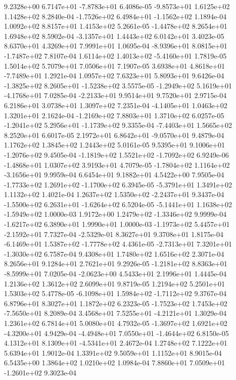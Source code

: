  9.2328e+00  6.7147e+01 -7.8783e+01  6.4086e-05
-9.8573e+01  1.6125e+02  1.1428e+02  8.2840e-04
-1.7526e+02  6.4984e+01 -1.1562e+02  1.1894e-04
1.0092e+02 8.8157e+01 1.4153e+02  5.2661e-05
-1.4478e+02  8.2654e+01  1.6948e+02  8.5902e-04
-3.1357e+01  1.4443e+02  6.0142e+01  3.4023e-05
8.6370e+01 4.3269e+01 7.9991e+01  1.0695e-04
-8.9396e+01  8.0815e+01 -1.7487e+02  7.8107e-04
 1.6114e+02  1.4013e+02 -5.4160e+01  1.7819e-05
1.5014e+02 5.7079e+01 7.0506e+01  7.1907e-05
 3.6938e+01  4.8618e+01 -7.7489e+01  1.2921e-04
1.0957e+02 7.6323e+01 5.8093e+01  9.6426e-04
-1.3825e+02  8.2605e+01 -1.5238e+02  3.5575e-05
-1.2949e+02  5.1619e+01 -4.1768e+01  7.0285e-04
-2.2133e+01  9.9514e+01  9.7520e+01  2.9715e-04
6.2186e+01 3.0738e+01 1.3097e+02  7.2351e-04
-4.1405e+01  1.0463e+02  1.3201e+01  2.1624e-04
-1.2169e+02  7.8803e+01  1.3710e+02  6.0257e-05
-1.2041e+02  5.2956e+01 -1.1739e+02  9.3355e-04
-7.4403e+01  1.5665e+02  8.2520e+01  6.6017e-05
 2.1972e+01  6.8642e+01 -9.0570e+01  9.4879e-04
1.1762e+02 1.3845e+02 1.2443e+02  5.0161e-05
 9.5395e+01  9.1006e+01 -1.2076e+02  9.4505e-04
-1.1819e+02  1.5521e+02 -1.7092e+02  6.9249e-06
-1.4868e+01  1.0307e+02  3.9193e+01  4.7079e-05
-1.7804e+02  1.1164e+02 -3.1656e+01  9.9959e-04
6.6454e+01 9.1882e+01 4.5422e+00  7.9505e-04
-1.7733e+02  1.2691e+02 -1.1700e+02  6.3945e-05
-5.3791e+01  1.3491e+02  1.1132e+02  1.4021e-04
 1.2637e+02  1.5350e+02 -2.2437e+01  9.3437e-04
-1.5500e+02  6.2631e+01 -1.6264e+02  6.5204e-05
-5.1441e+01  1.1638e+02 -1.5949e+02  1.0000e-03
 1.9172e+00  1.2479e+02 -1.3346e+02  9.9999e-04
-1.6217e+02  6.3890e+01  1.9990e+01  1.0000e-03
-1.1973e+02  5.4457e+01 -2.1592e+01  7.7327e-04
-2.5329e-01  8.3627e+01  9.3708e+01  1.8175e-04
-6.1469e+01  1.5387e+02 -1.7778e+02  4.4361e-05
-2.7313e+01  7.3201e+01 -1.3030e+02  6.7587e-04
9.4308e+01 1.7480e+02 1.6516e+02  2.3071e-04
8.2656e+01 9.1284e+01 2.7621e+01  9.2926e-05
-1.2181e+02  8.8363e+01 -8.5999e+01  7.0205e-04
-2.0623e+00  4.5433e+01  2.1996e+01  1.4445e-04
1.2136e+02 1.3612e+02 2.6099e+01  9.8719e-05
1.2194e+02 5.2501e+01 1.5303e+02  5.4778e-05
-6.1098e+01  1.5984e+02 -1.7112e+02  9.3767e-04
6.8796e+01 8.3027e+01 1.1872e+02  6.2323e-05
-1.7523e+02  1.7453e+02 -7.5650e+01  8.2089e-04
 3.4568e+01  7.5255e+01 -4.2121e+01  1.3029e-04
1.2361e+02 6.7814e+01 5.0080e+01  4.7932e-05
-1.3697e+02  1.6921e+02 -4.3200e+01  4.9429e-04
-4.4948e+01  7.0550e+01 -1.4644e+02  6.8150e-05
 4.1312e+01  8.1309e+01 -4.5341e+01  2.4672e-04
1.2748e+02 7.1222e+01 5.6394e+01  1.9012e-04
1.3391e+02 9.5059e+01 1.1152e+01  8.9015e-04
6.5435e+00 1.3864e+02 1.0210e+02  1.0984e-04
 7.8860e+01  7.0509e+01 -1.2601e+02  9.3023e-04
